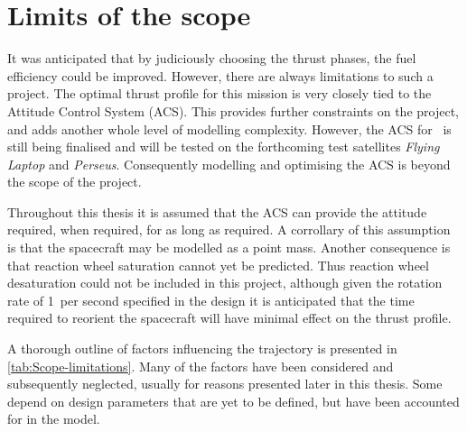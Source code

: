 \section{Limits of the scope} \label{sec:Limits}

It was anticipated that by judiciously choosing the thrust phases, the fuel efficiency could be improved. However, there are always limitations to such a project. The optimal thrust profile for this mission is very closely tied to the Attitude Control System (ACS). This provides further constraints on the project, and adds another whole level of modelling complexity. However, the ACS for \BW\ is still being finalised and will be tested on the forthcoming test satellites \emph{Flying Laptop} and \emph{Perseus}. Consequently modelling and optimising the ACS is beyond the scope of the project. 

Throughout this thesis it is assumed that the ACS can provide the attitude required, when required, for as long as required. A corrollary of this assumption is that the spacecraft may be modelled as a point mass. Another consequence is that reaction wheel saturation cannot yet be predicted. Thus reaction wheel desaturation could not be included in this project, although given the rotation rate of 1\degrees\ per second specified in the design it is anticipated that the time required to reorient the spacecraft will have minimal effect on the thrust profile.

A thorough outline of factors influencing the trajectory is presented in \autoref{tab:Scope-limitations}. Many of the factors have been considered and subsequently neglected, usually for reasons presented later in this thesis. Some depend on design parameters that are yet to be defined, but have been accounted for in the model.

